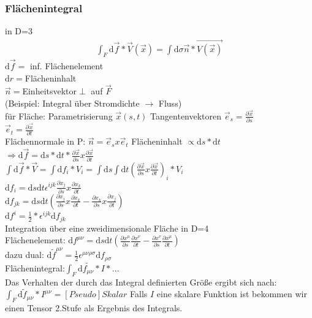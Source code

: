 \documentclass[a4paper]{article}
\begin{document}
\subsubsection{Flächenintegral}
in D=3
\begin{align}
\int_F \mathrm{d}\vec{f}*\vec{V}(\vec{x})=\int \mathrm{d}\sigma \vec{n}*\vec{V(\vec{x})}
\end{align}
$\mathrm{d}\vec{f}=$ inf. Flächenelement\\
$\mathrm{d}r=$Flächeninhalt\\
$\vec{n}=$Einheitsvektor$\perp$ auf $\vec{F}$\\
(Beispiel: Integral über Stromdichte $\rightarrow$ Fluss)\\
für Fläche: Parametrisierung $\vec{x}(s,t)$
Tangentenvektoren $\vec{e}_s=\frac{\partial\vec{x}}{\partial s}$ \\
$\vec{e}_t=\frac{\partial\vec{x}}{\partial t}$\\
Flächennormale in P: $\vec{n}=\vec{e}_s x \vec{e}_t$
Flächeninhalt $\propto \mathrm{d}s*\mathrm{d}t$\\
$\Rightarrow \mathrm{d}\vec{f}=\mathrm{d}s*\mathrm{d}t*\frac{\partial\vec{x}}{\partial
s}x\frac{\partial\vec{x}}{\partial t}$\\
$\int \mathrm{d}\vec{f}*\vec{V}=\int \mathrm{d}f_i*V_i=\int \mathrm{d}s \int \mathrm{d}t
(\frac{\partial\vec{x}}{\partial s}x\frac{\partial\vec{x}}{\partial t})_i *
V_i$\\
$\mathrm{d}f_i=\mathrm{d}s\mathrm{d}t\epsilon^{ijk}\frac{\partial x_j}{\partial
s}x\frac{\partial x_k}{\partial t}$\\
$\mathrm{d}f_{jk}=\mathrm{d}s \mathrm{d}t \left(\frac{\partial x_j}{\partial
s}x\frac{\partial x_k}{\partial t}-\frac{\partial x_k}{\partial
s}x\frac{\partial x_j}{\partial t}\right)$\\
$\mathrm{d}f^i=\frac{1}{2}*\epsilon^{ijk} \mathrm{d}f_{jk}$\\
Integration über eine zweidimensionale Fläche in D=4\\
Flächenelement: $\mathrm{d}f^{\mu\nu}=\mathrm{d}s \mathrm{d}t \left(\frac{\partial x^\mu}{\partial
s}\frac{\partial x^\nu}{\partial t}-\frac{\partial x^\nu}{\partial s}
\frac{\partial x^\mu}{\partial t} \right)$\\
dazu dual:
$\mathrm{d}\tilde{f}^{\mu\nu}=\frac{1}{2}\epsilon^{\mu\nu\rho\sigma}\mathrm{d}f_{\rho\sigma}$\\
Flächenintegral:$\int_F \mathrm{d}\tilde{f_{\mu\nu}} *I*\ldots$\\
Das Verhalten der durch das Integral definierten Größe ergibt sich nach:\\
$\int_F \mathrm{d}\tilde{f}_{\mu\nu} *I^{\mu\nu}=[Pseudo]Skalar$
Falls $I$ eine skalare Funktion ist bekommen wir einen Tensor 2.Stufe als
Ergebnis des Integrals.\\
\end{document}
